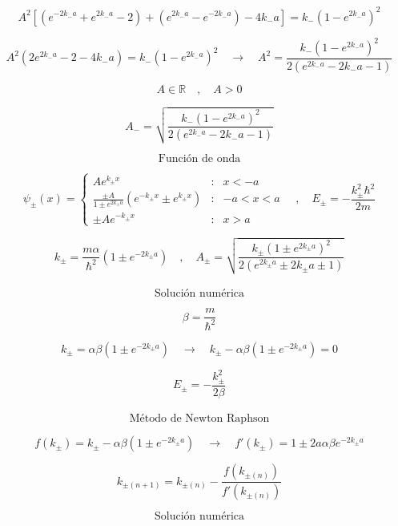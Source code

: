 \documentclass[10pt,a4papper]{article}
\begin{document}
\[A^2\left[(e^{-2k_- a}+e^{2k_- a}-2)+\left(e^{2k_- a}-e^{-2k_- a}\right)-4k_- a\right]=k_-(1-e^{2k_- a})^2\]

\[A^2\left(2e^{2k_- a}-2-4k_- a\right)=k_-(1-e^{2k_- a})^2\quad\to\quad
A^2=\frac{k_-(1-e^{2k_- a})^2}{2\left(e^{2k_- a}-2k_- a-1\right)}\]

\[A\in\mathbb{R}\quad,\quad A>0\]

\[\boxed{A_-=\sqrt{\frac{k_-(1-e^{2k_- a})^2}{2\left(e^{2k_- a}-2k_- a-1\right)}}}\]

\newpage
\[\text{Función de onda}\]

\[\psi_\pm(x)=
\left\{\begin{array}{ccc}
Ae^{k_\pm x} & : & x<-a \\
\frac{\pm A}{1\pm e^{2k_\pm a}}\left(e^{-k_\pm x}\pm e^{k_\pm x}\right) & : & -a<x<a\\
\pm Ae^{-k_\pm x} & : & x>a
\end{array}\quad,\quad
E_\pm=-\frac{k_\pm^2\hbar^2}{2m}\]

\[k_\pm=\frac{m\alpha}{\hbar^2}\left(1\pm e^{-2k_\pm a}\right)\quad,\quad
A_\pm=\sqrt{\frac{k_\pm(1\pm e^{2k_\pm a})^2}{2\left(e^{2k_\pm a}\pm2k_\pm a\pm 1\right)}}\]\\

\newpage
\[\text{Solución numérica}\]

\[\beta=\frac{m}{\hbar^2}\]

\[k_\pm=\alpha\beta\left(1\pm e^{-2k_\pm a}\right)\quad\to\quad
k_\pm-\alpha\beta\left(1\pm e^{-2k_\pm a}\right)=0\]

\[E_\pm=-\frac{k_\pm^2}{2\beta}\]\\

\[\text{Método de Newton Raphson}\]

\[f(k_\pm)=k_\pm-\alpha\beta\left(1\pm e^{-2k_\pm a}\right)\quad\to\quad
f'(k_\pm)=1\pm 2a\alpha\beta e^{-2k_\pm a}\]

\[k_{\pm(n+1)}=k_{\pm(n)}-\frac{f(k_{\pm(n)})}{f'(k_{\pm(n)})}\]

\newpage
\[\text{Solución numérica}\]
\end{document}
